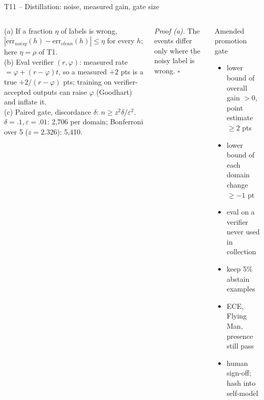 \documentclass[aspectratio=169,10pt]{beamer}
\begin{document}
\begin{frame}{T11 -- Distillation: noise, measured gain, gate size}
\begin{columns}[T]
\begin{theorem}[T11]\small
(a) If a fraction $\eta$ of labels is wrong, $|\mathrm{err}_{noisy}(h)-\mathrm{err}_{clean}(h)|\le\eta$ for every $h$; here $\eta=\rho$ of T1.\\
(b) Eval verifier $(r,\varphi)$: measured rate $=\varphi+(r-\varphi)t$, so a measured $+2$ pts is a true $+2/(r-\varphi)$ pts; training on verifier-accepted outputs can raise $\varphi$ (Goodhart) and inflate it.\\
(c) Paired gate, discordance $\delta$: $n\ge z^2\delta/\varepsilon^2$. $\delta{=}.1,\varepsilon{=}.01$: 2,706 per domain; Bonferroni over 5 ($z{=}2.326$): 5,410.
\end{theorem}
\small\textit{Proof (a).} The events differ only where the noisy label is wrong. \hfill$\square$
\begin{alertblock}{Amended promotion gate}
\small
\begin{itemize}\setlength\itemsep{0pt}
\item lower bound of overall gain $>0$, point estimate $\ge2$ pts
\item lower bound of each domain change $\ge-1$ pt
\item eval on a verifier never used in collection
\item keep 5\% abstain examples
\item ECE, Flying Man, presence still pass
\item human sign-off; hash into self-model
\end{itemize}
\end{alertblock}
\end{columns}
\end{frame}
\end{document}
